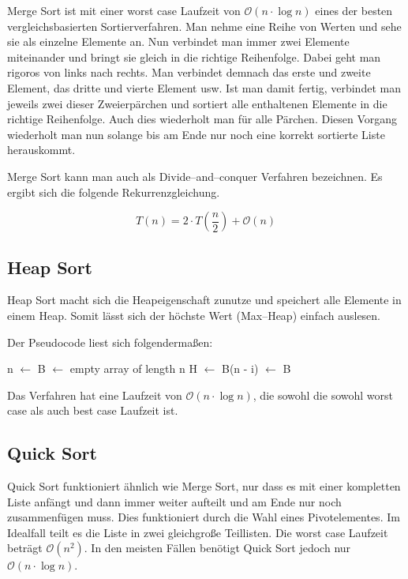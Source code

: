 \documentclass[10pt,a4paper,oneside,ngerman,numbers=noenddot]{scrartcl}
\begin{document}
		Merge Sort ist mit einer worst case Laufzeit von $\mathcal{O}(n \cdot \log n)$ eines der besten vergleichsbasierten Sortierverfahren. Man nehme eine Reihe von Werten und sehe sie als einzelne Elemente an. Nun verbindet man immer zwei Elemente miteinander und bringt sie gleich in die richtige Reihenfolge. Dabei geht man rigoros von links nach rechts. Man verbindet demnach das erste und zweite Element, das dritte und vierte Element usw. Ist man damit fertig, verbindet man jeweils zwei dieser Zweierpärchen und sortiert alle enthaltenen Elemente in die richtige Reihenfolge. Auch dies wiederholt man für alle Pärchen. Diesen Vorgang wiederholt man nun solange bis am Ende nur noch eine korrekt sortierte Liste herauskommt. 
		
		Merge Sort kann man auch als Divide--and--conquer Verfahren bezeichnen. Es ergibt sich die folgende Rekurrenzgleichung.
		
		\[
			T(n) = 2 \cdot T\left(\frac{n}{2}\right) + \mathcal{O}(n)
		\]
		
	\subsection{Heap Sort}
	
		Heap Sort macht sich die Heapeigenschaft zunutze und speichert alle Elemente in einem Heap. Somit lässt sich der höchste Wert (Max--Heap) einfach auslesen.
		
		Der Pseudocode liest sich folgendermaßen:
		
		\begin{algorithmic}[1]
				\State n $\gets$ 
				\State B $\gets$ empty array of length n
				\State H $\gets$ 
					\State B(n - i) $\gets$ 
				\EndFor
				\State \Return B
			\EndFunction
		\end{algorithmic}
		
		Das Verfahren hat eine Laufzeit von $\mathcal{O}(n \cdot \log n)$, die sowohl die sowohl worst case als auch best case Laufzeit ist.
		
	\subsection{Quick Sort}
	
		Quick Sort funktioniert ähnlich wie Merge Sort, nur dass es mit einer kompletten Liste anfängt und dann immer weiter aufteilt und am Ende nur noch zusammenfügen muss. Dies funktioniert durch die Wahl eines Pivotelementes. Im Idealfall teilt es die Liste in zwei gleichgroße Teillisten. Die worst case Laufzeit beträgt $\mathcal{O}(n^{2})$. In den meisten Fällen benötigt Quick Sort jedoch nur $\mathcal{O}(n \cdot \log n)$.
		
\end{document}
